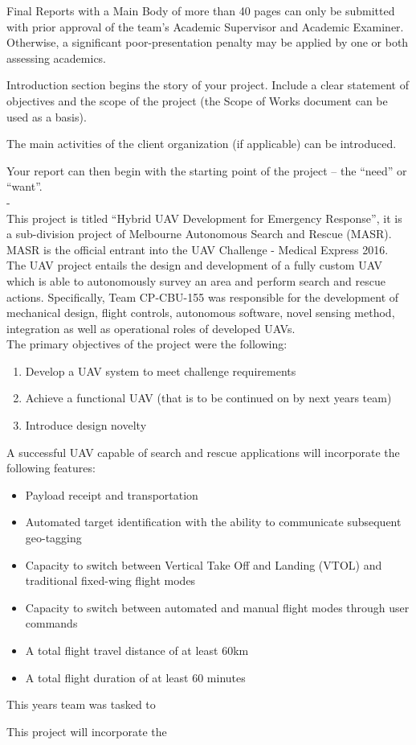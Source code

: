Final Reports with a Main Body of more than 40 pages can only be submitted with prior approval of the team’s Academic Supervisor and Academic Examiner.  Otherwise, a significant poor-presentation penalty may be applied by one or both assessing academics.

Introduction section begins the story of your project.  Include a clear statement of objectives and the scope of the project (the Scope of Works document can be used as a basis).

The main activities of the client organization (if applicable) can be introduced.

Your report can then begin with the starting point of the project – the “need” or “want”. \\

-\\

This project is titled ``Hybrid UAV Development for Emergency Response'', it is a sub-division project of Melbourne Autonomous Search and Rescue (MASR). MASR is the official entrant into the UAV  Challenge - Medical Express 2016.\\

The UAV project entails the design and development of a fully custom UAV which is able to autonomously survey an area and perform search and rescue actions. Specifically, Team CP-CBU-155 was responsible for the development of mechanical design, flight controls, autonomous software, novel sensing method, integration as well as operational roles of developed UAVs.\\

The primary objectives of the project were the following:

\begin{enumerate}
	\item Develop a UAV system to meet challenge requirements
	\item Achieve a functional UAV (that is to be continued on by next years team)
	\item Introduce design novelty \\
\end{enumerate}

A successful UAV capable of search and rescue applications will incorporate the following features:
\begin{itemize}
	\item Payload receipt and transportation
	\item Automated target identification with the ability to communicate subsequent geo-tagging
	\item Capacity to switch between Vertical Take Off and Landing (VTOL) and traditional fixed-wing flight modes
	\item Capacity to switch between automated and manual flight modes through user commands
	\item A total flight travel distance of at least 60km
	\item A total flight duration of at least 60 minutes\\
\end{itemize}

This years team was tasked to 

This project will incorporate the
